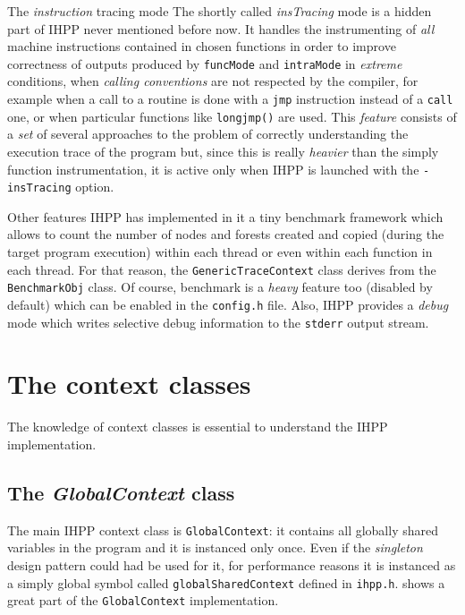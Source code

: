 \documentclass[a4paper,10pt]{report}
\begin{document}
\begin{paragraph}{The \emph{instruction} tracing mode}
The shortly called \emph{insTracing} mode is a hidden part of IHPP never
mentioned before now. It handles the instrumenting of \emph{all} machine instructions
contained in chosen functions in order to improve correctness 
of outputs produced by \verb|funcMode| and \verb|intraMode| 
in \emph{extreme} conditions, when \emph{calling conventions} are not
respected by the compiler, for example when a call to a routine is done 
with a \verb|jmp| instruction 
instead of a \verb|call| one, or when particular functions like \verb|longjmp()| are used.
This \emph{feature} consists of a \emph{set} of several approaches to the problem 
of correctly understanding the execution trace of the program but, 
since this is really \emph{heavier} than the simply function instrumentation,
it is active only when IHPP is launched with the \verb|-insTracing| option.
\end{paragraph}

\begin{paragraph}{Other features}
IHPP has implemented in it a tiny benchmark framework which allows 
to count the number of nodes and forests created and copied (during the 
target program execution) within each
thread or even within each function in each thread. For that reason,
the \verb|GenericTraceContext| class derives from the \verb|BenchmarkObj| class.
Of course, benchmark is a \emph{heavy} feature too (disabled by default) which can be enabled 
in the \verb|config.h| file.
Also, IHPP provides a \emph{debug} mode
which writes selective debug information to the \verb|stderr| output stream.
\end{paragraph}

\section{The context classes}

The knowledge of context classes is essential to understand the IHPP implementation.

\subsection{The \emph{GlobalContext} class}
The main IHPP context class is \verb|GlobalContext|: it contains all globally shared variables in the program and it is instanced only once. 
Even if the \emph{singleton} design pattern could had be used for it, for 
performance reasons it is instanced as a simply global symbol called \verb|globalSharedContext| defined in \verb|ihpp.h|.
 shows a great part of the \verb|GlobalContext| implementation.
\end{document}
